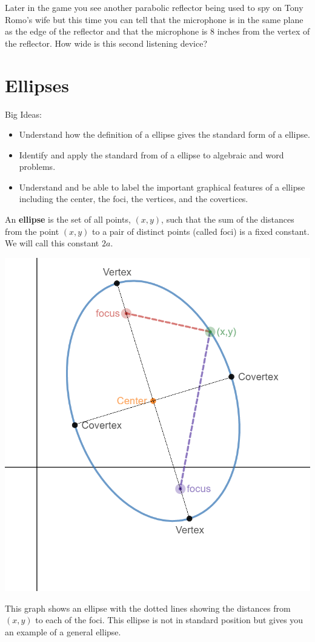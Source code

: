 \question Later in the game you see another parabolic reflector being used to spy on Tony Romo's wife but this time you can tell that the microphone is in the same plane as the edge of the reflector and that the microphone is 8 inches from the vertex of the reflector. How wide is this second listening device?

\section{Ellipses}
Big Ideas:
\begin{itemize}
\item Understand how the definition of a ellipse gives the standard form of a ellipse.
\item Identify and apply the standard from of a ellipse to algebraic and word problems.
\item Understand and be able to label the important graphical features of a ellipse including the center, the foci, the vertices, and the covertices.
\end{itemize}
\begin{info} An \textbf{ellipse} is the set of all points, $(x,y)$, such that the sum of the distances from the point $(x,y)$ to a pair of distinct points (called foci) is a fixed constant. We will call this constant $2a$.
\end{info}
\begin{center} \includegraphics[scale=.45]{generalellipse3.png} \end{center}
This graph shows an ellipse with the dotted lines showing the distances from $(x,y)$ to each of the foci. This ellipse is not in standard position but gives you an example of a general ellipse.

